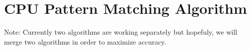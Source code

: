 \section{CPU Pattern Matching Algorithm}
\label{sec:algorithm}

Note: Currently two algorithms are working separately but hopefuly, we will merge two algorithms in order to maximize accuracy.




